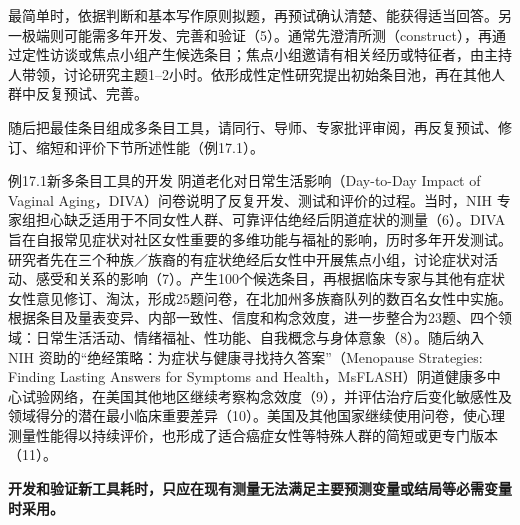 最简单时，依据判断和基本写作原则拟题，再预试确认清楚、能获得适当回答。另一极端则可能需多年开发、完善和验证（5）。通常先澄清所测（construct），再通过定性访谈或焦点小组产生候选条目；焦点小组邀请有相关经历或特征者，由主持人带领，讨论研究主题1--2小时。依形成性定性研究提出初始条目池，再在其他人群中反复预试、完善。

随后把最佳条目组成多条目工具，请同行、导师、专家批评审阅，再反复预试、修订、缩短和评价下节所述性能（例17.1）。
\begin{bookbox}{例17.1\quad 新多条目工具的开发}
阴道老化对日常生活影响（Day-to-Day Impact of Vaginal Aging，DIVA）问卷说明了反复开发、测试和评价的过程。当时，NIH 专家组担心缺乏适用于不同女性人群、可靠评估绝经后阴道症状的测量（6）。DIVA 旨在自报常见症状对社区女性重要的多维功能与福祉的影响，历时多年开发测试。研究者先在三个种族／族裔的有症状绝经后女性中开展焦点小组，讨论症状对活动、感受和关系的影响（7）。产生100个候选条目，再根据临床专家与其他有症状女性意见修订、淘汰，形成25题问卷，在北加州多族裔队列的数百名女性中实施。根据条目及量表变异、内部一致性、信度和构念效度，进一步整合为23题、四个领域：日常生活活动、情绪福祉、性功能、自我概念与身体意象（8）。随后纳入 NIH 资助的“绝经策略：为症状与健康寻找持久答案”（Menopause Strategies: Finding Lasting Answers for Symptoms and Health，MsFLASH）阴道健康多中心试验网络，在美国其他地区继续考察构念效度（9），并评估治疗后变化敏感性及领域得分的潜在最小临床重要差异（10）。美国及其他国家继续使用问卷，使心理测量性能得以持续评价，也形成了适合癌症女性等特殊人群的简短或更专门版本（11）。
\end{bookbox}
\textbf{开发和验证新工具耗时，只应在现有测量无法满足主要预测变量或结局等必需变量时采用。}


